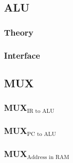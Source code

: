\documentclass[11pt]{article}
\begin{document}
\subsection{ALU}
\label{sec:org7d3fdea}
\subsubsection{Theory}
\label{sec:org464ea79}
\subsubsection{Interface}
\label{sec:orgc160bee}
\subsection{MUX}
\label{sec:orgd28a3ce}
\subsubsection{MUX\(_{\text{IR to ALU}}\)}
\label{sec:orga45df31}
\subsubsection{MUX\(_{\text{PC to ALU}}\)}
\label{sec:orgc19331c}
\subsubsection{MUX\(_{\text{Address in RAM}}\)}
\label{sec:org5295fac}
\end{document}
